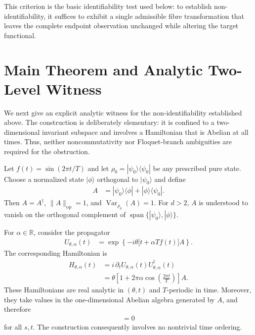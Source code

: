 \documentclass[twocolumn,prl,aps,floatfix]{revtex4-2}
\begin{document}
This criterion is the basic identifiability test used below: to establish non-identifiability, it suffices to exhibit a single admissible fibre transformation that leaves the complete endpoint observation unchanged while altering the target functional.

\section{Main Theorem and Analytic Two-Level Witness}

We next give an explicit analytic witness for the non-identifiability established above. The construction is deliberately elementary: it is confined to a two-dimensional invariant subspace and involves a Hamiltonian that is Abelian at all times. Thus, neither noncommutativity nor Floquet-branch ambiguities are required for the obstruction.

Let $f(t)=\sin(2\pi t/T)$ and let
$\rho_0=|\psi_0\rangle\langle\psi_0|$ be any prescribed pure state. Choose a normalized state $|\phi\rangle$ orthogonal to $|\psi_0\rangle$ and define
\begin{align}
A&=|\psi_0\rangle\langle\phi|
+|\phi\rangle\langle\psi_0|.
\end{align}
Then $A=A^\dagger$, $\|A\|_{\mathrm{op}}=1$, and
$\operatorname{Var}_{\rho_0}(A)=1$. For $d>2$, $A$ is understood to vanish on the orthogonal complement of
$\operatorname{span}\{|\psi_0\rangle,|\phi\rangle\}$.

For $\alpha\in\mathbb R$, consider the propagator
\begin{align}
U_{\theta,\alpha}(t)
&=
\exp\left\{
-i\theta\bigl[t+\alpha T f(t)\bigr]A
\right\}.
\label{eq:witness_propagator}
\end{align}
The corresponding Hamiltonian is
\begin{align}
H_{\theta,\alpha}(t)
&=
i\,\partial_tU_{\theta,\alpha}(t)
U_{\theta,\alpha}^\dagger(t)
\nonumber\\
&=
\theta
\left[
1+2\pi\alpha\cos\left(\frac{2\pi t}{T}\right)
\right]A .
\label{eq:witness_hamiltonian}
\end{align}
These Hamiltonians are real analytic in $(\theta,t)$ and $T$-periodic in time. Moreover, they take values in the one-dimensional Abelian algebra generated by $A$, and therefore
\begin{align}
[H_{\theta,\alpha}(t),H_{\theta,\alpha}(s)]=0
\end{align}
for all $s,t$. The construction consequently involves no nontrivial time ordering.
\end{document}

